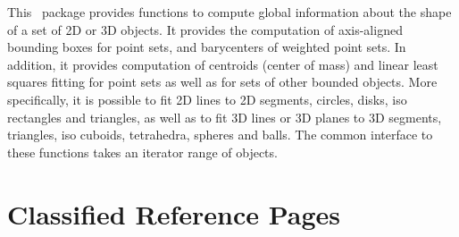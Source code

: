


This \cgal\ package provides functions to compute global information about the shape of a set of 2D or 3D objects. It provides the computation of axis-aligned bounding boxes for point sets, and barycenters of weighted point sets. In addition, it provides computation of centroids (center of mass) and linear least squares fitting for point sets as well as for sets of other bounded objects. More specifically, it is possible to fit 2D lines to 2D segments, circles, disks, iso rectangles and triangles, as well as to fit 3D lines or 3D planes to 3D segments, triangles, iso cuboids, tetrahedra, spheres and balls. The common interface to these functions takes an iterator range of objects.

\section{Classified Reference Pages}


\\
\\
\\
\\
\\

